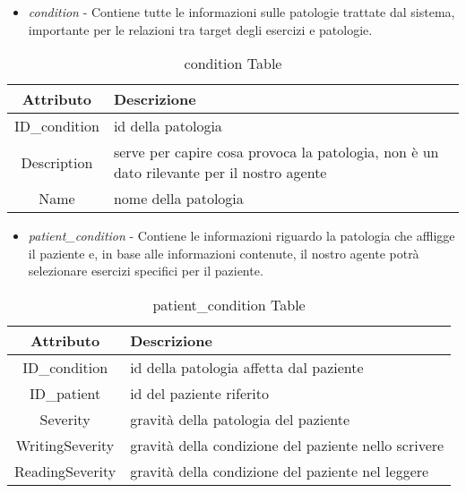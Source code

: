 \documentclass{article}
\begin{document}
\pagebreak


\begin{itemize}
\item     \textit{condition} - Contiene tutte le informazioni sulle patologie trattate dal sistema, importante per le relazioni tra target degli esercizi e patologie.
\end{itemize}

    \begin{table}[h]
        \centering

        \begin{tabular}{|c|p{8cm}|}
            \hline
                \textbf{Attributo} & \textbf{Descrizione} \\
            \hline
                ID\_condition & id della patologia\\
            \hline
                Description & serve per capire cosa provoca la patologia, non è un dato rilevante per il nostro agente\\
            \hline
                Name & nome della patologia\\
            \hline
        \end{tabular}
        \caption{condition Table}
    \end{table}




\begin{itemize}
\item     \textit{patient\_condition} - Contiene le informazioni riguardo la patologia che affligge il paziente e, in base alle informazioni contenute, il nostro agente potrà selezionare esercizi specifici per il paziente.
\end{itemize}

    \begin{table}[h]
        \centering

        \begin{tabular}{|c|p{8cm}|}
            \hline
            \textbf{Attributo} & \textbf{Descrizione} \\
            \hline
                ID\_condition & id della patologia affetta dal paziente\\
            \hline
                ID\_patient & id del paziente riferito\\
            \hline
                Severity & gravità della patologia del paziente \\
            \hline
                WritingSeverity & gravità della condizione del paziente nello scrivere\\
            \hline
                ReadingSeverity & gravità della condizione del paziente nel leggere\\
            \hline
        \end{tabular}
        \caption{patient\_condition Table}
    \end{table}
\end{document}
